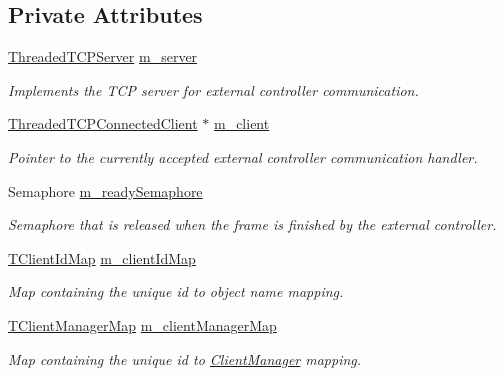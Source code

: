 \subsection*{Private Attributes}
\begin{DoxyCompactItemize}
\item 
\hyperlink{class_threaded_t_c_p_server}{Threaded\-T\-C\-P\-Server} \hyperlink{class_control_manager_a1b71eabaeddfd8ec80e503b734c72e9d}{m\-\_\-server}
\begin{DoxyCompactList}\small\item\em Implements the T\-C\-P server for external controller communication. \end{DoxyCompactList}\item 
\hyperlink{class_threaded_t_c_p_connected_client}{Threaded\-T\-C\-P\-Connected\-Client} $\ast$ \hyperlink{class_control_manager_a3081c331c70f5b08dc0ef2615d86cc55}{m\-\_\-client}
\begin{DoxyCompactList}\small\item\em Pointer to the currently accepted external controller communication handler. \end{DoxyCompactList}\item 
Semaphore \hyperlink{class_control_manager_ab718d2d17750dfea91411de871855075}{m\-\_\-ready\-Semaphore}
\begin{DoxyCompactList}\small\item\em Semaphore that is released when the frame is finished by the external controller. \end{DoxyCompactList}\item 
\hyperlink{class_control_manager_a5f6aa6ca619f6aa8dddfc3d5000162f0}{T\-Client\-Id\-Map} \hyperlink{class_control_manager_a5623f6ef4da21d143a7a6cf5fbee136f}{m\-\_\-client\-Id\-Map}
\begin{DoxyCompactList}\small\item\em Map containing the unique id to object name mapping. \end{DoxyCompactList}\item 
\hyperlink{class_control_manager_a27b18022695359e2a4d5563f91b6befd}{T\-Client\-Manager\-Map} \hyperlink{class_control_manager_af47dee5a077190c6aeb7b9ef3d9cfb3b}{m\-\_\-client\-Manager\-Map}
\begin{DoxyCompactList}\small\item\em Map containing the unique id to \hyperlink{class_client_manager}{Client\-Manager} mapping. \end{DoxyCompactList}\end{DoxyCompactItemize}
